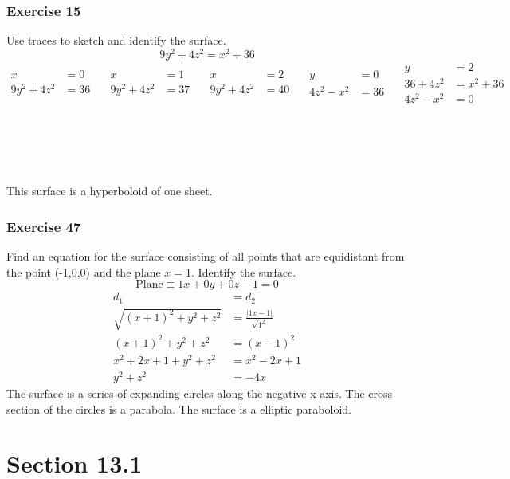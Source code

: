 \documentclass{math}
\begin{document}
\subsubsection*{Exercise 15}
Use traces to sketch and identify the surface.
\[ 9y^2+4z^2 = x^2+36 \]
\[\begin{split}
  x &= 0 \\
  9y^2+4z^2 &= 36
\end{split}\quad
\begin{split}
  x &= 1 \\
  9y^2+4z^2 &= 37
\end{split}\quad
\begin{split}
  x &= 2 \\
  9y^2+4z^2 &= 40
\end{split}\quad
\begin{split}
  y &= 0 \\
  4z^2-x^2 &= 36
\end{split}\quad
\begin{split}
  y &= 2 \\
  36+4z^2 &= x^2+36 \\
  4z^2-x^2 &= 0
\end{split} \]
\\ \\ \\ \\ \\
This surface is a hyperboloid of one sheet.

\subsubsection*{Exercise 47}
Find an equation for the surface consisting of all points that are
equidistant from the point (-1,0,0) and the plane \( x = 1 \). Identify the
surface.
\[ \text{Plane} \equiv 1x+0y+0z-1 = 0 \]
\begin{align*}
  d_1 &= d_2 \\
  \sqrt{(x+1)^2+y^2+z^2} &= \frac{|1x-1|}{\sqrt{1^2}} \\
  (x+1)^2+y^2+z^2 &= (x-1)^2 \\
  x^2+2x+1+y^2+z^2 &= x^2-2x+1 \\
  y^2+z^2 &= -4x
\end{align*}
The surface is a series of expanding circles along the negative x-axis. The
cross section of the circles is a parabola. The surface is a elliptic
paraboloid.

\section*{Section 13.1}
\end{document}
